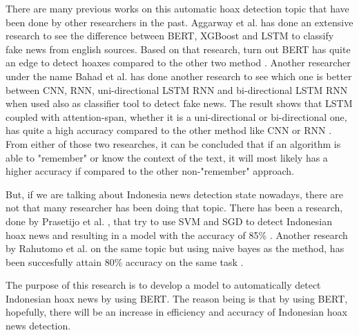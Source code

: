 There are many previous works on this automatic hoax detection topic that have been done by other researchers in the past. Aggarway et al. has done an extensive research to see the difference between BERT, XGBoost and LSTM to classify fake news from english sources. Based on that research, turn out BERT has quite an edge to detect hoaxes compared to the other two method \cite{bert_news_classi}. Another researcher under the name Bahad et al. has done another research to see which one is better between CNN, RNN, uni-directional LSTM RNN and bi-directional LSTM RNN when used also as classifier tool to detect fake news. The result shows that LSTM coupled with attention-span, whether it is a uni-directional or bi-directional one, has quite a high accuracy compared to the other method like CNN or RNN \cite{bahad_lstm}. From either of those two researches, it can be concluded that if an algorithm is able to "remember" or know the context of the text, it will most likely has a higher accuracy if compared to the other non-"remember" approach.

But, if we are talking about Indonesia news detection state nowadays, there are not that many researcher has been doing that topic. There has been a research, done by Prasetijo et al. , that try to use SVM and SGD to detect Indonesian hoax news and resulting in a model with the accuracy of 85\% \cite{prasetijo}. Another research by Rahutomo et al. on the same topic but using naive bayes as the method, has been succesfully attain 80\% accuracy on the same task \cite{rahutomo}.

The purpose of this research is to develop a model to automatically detect Indonesian hoax news by using BERT. The reason being is that by using BERT, hopefully, there will be an increase in efficiency and accuracy of Indonesian hoax news detection.

